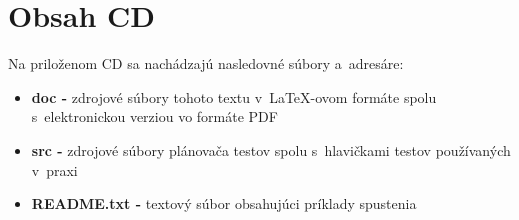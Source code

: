 \chapter{Obsah CD}
Na priloženom CD sa nachádzajú nasledovné súbory a~adresáre:
\begin{itemize}
\item \textbf{doc -} zdrojové súbory tohoto textu v~\LaTeX-ovom formáte spolu s~elektronickou verziou vo formáte PDF
\item \textbf{src -} zdrojové súbory plánovača testov spolu s~hlavičkami testov používaných v~praxi
\item \textbf{README.txt -} textový súbor obsahujúci príklady spustenia
\end{itemize}


